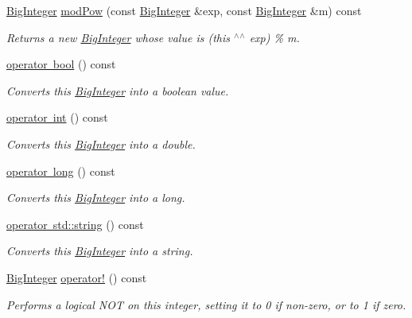 \begin{DoxyCompactItemize}
\mbox{\hyperlink{classBigInteger}{Big\+Integer}} \mbox{\hyperlink{classBigInteger_a0784fc13afdca5e439e2cb99dc2b1055}{mod\+Pow}} (const \mbox{\hyperlink{classBigInteger}{Big\+Integer}} \&exp, const \mbox{\hyperlink{classBigInteger}{Big\+Integer}} \&m) const
\begin{DoxyCompactList}\small\item\em Returns a new \mbox{\hyperlink{classBigInteger}{Big\+Integer}} whose value is (this $^\wedge$$^\wedge$ exp) \% m. \end{DoxyCompactList}\item 
\mbox{\hyperlink{classBigInteger_a67b76affb3b5d35fa419ac234144038b}{operator bool}} () const
\begin{DoxyCompactList}\small\item\em Converts this \mbox{\hyperlink{classBigInteger}{Big\+Integer}} into a boolean value. \end{DoxyCompactList}\item 
\mbox{\hyperlink{classBigInteger_a48d27bd92e68c69527589ea65a9af69f}{operator int}} () const
\begin{DoxyCompactList}\small\item\em Converts this \mbox{\hyperlink{classBigInteger}{Big\+Integer}} into a double. \end{DoxyCompactList}\item 
\mbox{\hyperlink{classBigInteger_ad7ce59321a0dd63e7f1fab6dceabe53b}{operator long}} () const
\begin{DoxyCompactList}\small\item\em Converts this \mbox{\hyperlink{classBigInteger}{Big\+Integer}} into a long. \end{DoxyCompactList}\item 
\mbox{\hyperlink{classBigInteger_a3888dcd59dd5acd1ca5b9bee4c2e252a}{operator std\+::string}} () const
\begin{DoxyCompactList}\small\item\em Converts this \mbox{\hyperlink{classBigInteger}{Big\+Integer}} into a string. \end{DoxyCompactList}\item 
\mbox{\hyperlink{classBigInteger}{Big\+Integer}} \mbox{\hyperlink{classBigInteger_a4e89621e8562bf05700c80653d1b046a}{operator!}} () const
\begin{DoxyCompactList}\small\item\em Performs a logical N\+OT on this integer, setting it to 0 if non-\/zero, or to 1 if zero. \end{DoxyCompactList}\item 

\end{DoxyCompactItemize}
